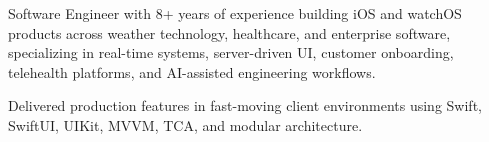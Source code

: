 \begin{zitemize}
\item Software Engineer with 8+ years of experience building iOS and watchOS products across weather technology, healthcare, and enterprise software, specializing in real-time systems, server-driven UI, customer onboarding, telehealth platforms, and AI-assisted engineering workflows.
\item Delivered production features in fast-moving client environments using Swift, SwiftUI, UIKit, MVVM, TCA, and modular architecture.
\end{zitemize}